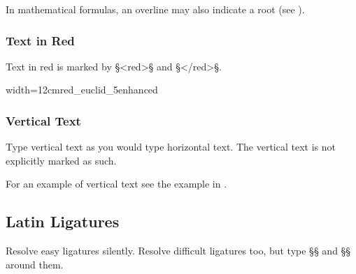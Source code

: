 \begin{crossref}
In mathematical formulas, an overline may also indicate a root (see ).
\end{crossref}


\subsubsection{Text in Red}
\label{section text in red}

\begin{mainruleLessImportant}
Text in red is marked by §<red>§ and §</red>§.
\end{mainruleLessImportant}

\vspace{3mm}
\begin{sampleImageSmall}{width=12cm}{red_euclid_5enhanced}

\end{sampleImageSmall}

\subsubsection{Vertical Text}

\begin{mainrule}
Type vertical text as you would type horizontal text. The vertical text is not explicitly marked as such.
\end{mainrule}

\begin{crossref}
For an example of vertical text see the example in .
\end{crossref}


\tocspace
\subsection{Latin Ligatures}
\label{section latin ligatures}

\begin{mainrule}
Resolve easy ligatures silently. Resolve difficult ligatures too, but type §{§ and §}§ around them.
\end{mainrule}

